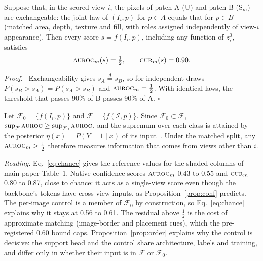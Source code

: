 \begin{proposition}[Exchangeability]\label{prop:exch}
Suppose that, in the scored view $i$, the pixels of patch A (U) and patch B
(S$_m$) are exchangeable: the joint law of $(I_i,p)$ for $p\!\in\!A$ equals
that for $p\!\in\!B$ (matched area, depth, texture and fill, with roles
assigned independently of view-$i$ appearance). Then every score
$s=f(I_i,p)$, including any function of $z^0_i$, satisfies
\begin{equation}
  \textsc{auroc}_m(s)=\tfrac12,\qquad \textsc{cur}_m(s)=0.90 .
  \label{eq:chance}
\end{equation}
\end{proposition}
\par\noindent\emph{Proof.}~
Exchangeability gives $s_A\overset{d}{=}s_B$, so for independent draws
$P(s_B>s_A)=P(s_A>s_B)$ and $\textsc{auroc}_m=\tfrac12$. With identical laws, the
threshold that passes 90\% of B passes 90\% of A.
\hfill$\square$\par

\begin{proposition}\label{prop:order}
Let $\mathcal{F}_0=\{f(I_i,p)\}$ and $\mathcal{F}=\{f(\mathcal{I},p)\}$. Since
$\mathcal{F}_0\subset\mathcal{F}$,
$\sup_{\mathcal{F}}\textsc{auroc}\ge\sup_{\mathcal{F}_0}\textsc{auroc}$, and the supremum over
each class is attained by the posterior $\eta(x)=P(Y\!=\!1\mid x)$ of its
input~\cite{menon2015corrupted}. Under the matched split, any
$\textsc{auroc}_m>\tfrac12$ therefore measures information that comes from views
other than $i$.
\end{proposition}

\noindent\emph{Reading.} Eq.~\eqref{eq:chance} gives the reference values for
the shaded columns of main-paper Table~1. Native confidence scores
$\textsc{auroc}_m$ 0.43 to 0.55 and $\textsc{cur}_m$ 0.80 to 0.87, close to chance: it acts as
a single-view score even though the backbone's tokens have cross-view inputs,
as Proposition~\ref{prop:conf} predicts. The per-image control is a member of
$\mathcal{F}_0$ by construction, so Eq.~\eqref{eq:chance} explains why it stays
at 0.56 to 0.61. The residual above $\tfrac12$ is the cost of approximate
matching (image-border and placement cues), which the pre-registered 0.60 bound
caps. Proposition~\ref{prop:order} explains why the control is decisive: the
support head and the control share architecture, labels and training, and
differ only in whether their input is in $\mathcal{F}$ or $\mathcal{F}_0$.

